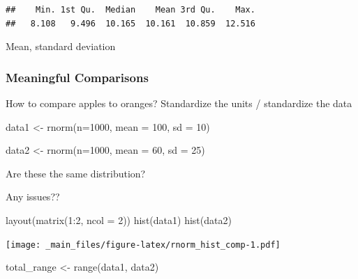 \documentclass[
]{book}
\newenvironment{Shaded}{\begin{snugshade}}{\end{snugshade}}
\newcommand{\AttributeTok}[1]{\textcolor[rgb]{0.77,0.63,0.00}{#1}}
\newcommand{\DecValTok}[1]{\textcolor[rgb]{0.00,0.00,0.81}{#1}}
\newcommand{\FunctionTok}[1]{\textcolor[rgb]{0.00,0.00,0.00}{#1}}
\newcommand{\NormalTok}[1]{#1}
\newcommand{\OtherTok}[1]{\textcolor[rgb]{0.56,0.35,0.01}{#1}}
\newcommand{\SpecialCharTok}[1]{\textcolor[rgb]{0.00,0.00,0.00}{#1}}
\begin{document}
\begin{verbatim}
##    Min. 1st Qu.  Median    Mean 3rd Qu.    Max. 
##   8.108   9.496  10.165  10.161  10.859  12.516
\end{verbatim}

Mean, standard deviation

\hypertarget{meaningful-comparisons}{%
\subsubsection{Meaningful Comparisons}\label{meaningful-comparisons}}

How to compare apples to oranges? Standardize the units / standardize the data

\begin{Shaded}
\begin{Highlighting}[]
\NormalTok{data1 }\OtherTok{\textless{}{-}} \FunctionTok{rnorm}\NormalTok{(}\AttributeTok{n=}\DecValTok{1000}\NormalTok{, }
              \AttributeTok{mean =} \DecValTok{100}\NormalTok{,}
              \AttributeTok{sd =} \DecValTok{10}\NormalTok{)}

\NormalTok{data2 }\OtherTok{\textless{}{-}} \FunctionTok{rnorm}\NormalTok{(}\AttributeTok{n=}\DecValTok{1000}\NormalTok{,}
               \AttributeTok{mean =} \DecValTok{60}\NormalTok{, }
               \AttributeTok{sd =} \DecValTok{25}\NormalTok{)}
\end{Highlighting}
\end{Shaded}

Are these the same distribution?

Any issues??

\begin{Shaded}
\begin{Highlighting}[]
\FunctionTok{layout}\NormalTok{(}\FunctionTok{matrix}\NormalTok{(}\DecValTok{1}\SpecialCharTok{:}\DecValTok{2}\NormalTok{, }\AttributeTok{ncol =} \DecValTok{2}\NormalTok{))}
\FunctionTok{hist}\NormalTok{(data1)}
\FunctionTok{hist}\NormalTok{(data2)}
\end{Highlighting}
\end{Shaded}

\texttt{[image: \_main\_files/figure-latex/rnorm\_hist\_comp-1.pdf]}

\begin{Shaded}
\begin{Highlighting}[]
\NormalTok{total\_range }\OtherTok{\textless{}{-}} \FunctionTok{range}\NormalTok{(data1, data2)}
\end{Highlighting}
\end{Shaded}
\end{document}

